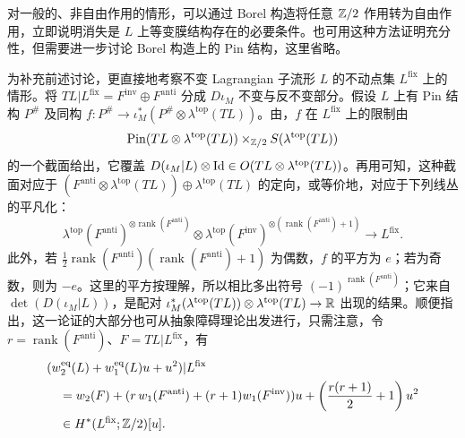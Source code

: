 对一般的、非自由作用的情形，可以通过 Borel 构造将任意 $\mathbb Z/2$ 作用转为自由作用，立即说明消失是 $L$ 上等变膜结构存在的必要条件。也可用这种方法证明充分性，但需要进一步讨论 Borel 构造上的 Pin 结构，这里省略。

为补充前述讨论，更直接地考察不变 Lagrangian 子流形 $L$ 的不动点集 $L^{\mathrm{fix}}$ 上的情形。将 $TL|L^{\mathrm{fix}}=F^{\mathrm{inv}}\oplus F^{\mathrm{anti}}$ 分成 $D\iota_M$ 不变与反不变部分。假设 $L$ 上有 Pin 结构 $P^\#$ 及同构 $f:P^\#\to\iota_M^*(P^\#\otimes\lambda^{\mathrm{top}}(TL))$。由，$f$ 在 $L^{\mathrm{fix}}$ 上的限制由
\[
\operatorname{Pin}(TL\otimes\lambda^{\mathrm{top}}(TL))\times_{\mathbb Z/2}S(\lambda^{\mathrm{top}}(TL))
\]
的一个截面给出，它覆盖 $D(\iota_M|L)\otimes\operatorname{Id}\in O(TL\otimes\lambda^{\mathrm{top}}(TL))$。再用可知，这种截面对应于 $(F^{\mathrm{anti}}\otimes\lambda^{\mathrm{top}}(TL))\oplus\lambda^{\mathrm{top}}(TL)$ 的定向，或等价地，对应于下列线丛的平凡化：
\begin{equation}\label{eq:14.5}
\lambda^{\mathrm{top}}(F^{\mathrm{anti}})^{\otimes\operatorname{rank}(F^{\mathrm{anti}})}
\otimes\lambda^{\mathrm{top}}(F^{\mathrm{inv}})^{\otimes(\operatorname{rank}(F^{\mathrm{anti}})+1)}\longrightarrow L^{\mathrm{fix}}.
\end{equation}
此外，若 $\frac12\operatorname{rank}(F^{\mathrm{anti}})(\operatorname{rank}(F^{\mathrm{anti}})+1)$ 为偶数，$f$ 的平方为 $e$；若为奇数，则为 $-e$。这里的平方按理解，所以相比多出符号 $(-1)^{\operatorname{rank}(F^{\mathrm{anti}})}$；它来自 $\det(D(\iota_M|L))$，是配对 $\iota_M^*(\lambda^{\mathrm{top}}(TL))\otimes\lambda^{\mathrm{top}}(TL)\to\mathbb R$ 出现的结果。顺便指出，这一论证的大部分也可从抽象障碍理论出发进行，只需注意，令 $r=\operatorname{rank}(F^{\mathrm{anti}})$、$F=TL|L^{\mathrm{fix}}$，有
\[
\begin{aligned}
&(w_2^{\mathrm{eq}}(L)+w_1^{\mathrm{eq}}(L)u+u^2)|L^{\mathrm{fix}}\\
&\quad=w_2(F)+(r\,w_1(F^{\mathrm{anti}})+(r+1)w_1(F^{\mathrm{inv}}))u
+\left(\frac{r(r+1)}2+1\right)u^2\\
&\quad\in H^*(L^{\mathrm{fix}};\mathbb Z/2)[u].
\end{aligned}
\]
